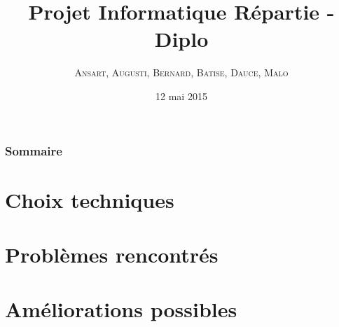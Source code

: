 \documentclass[handout]{beamer}
\title{
	Projet Informatique Répartie - Diplo
}
\author{
	\textsc{Ansart}, \textsc{Augusti}, \textsc{Bernard},
	\textsc{Batise}, \textsc{Dauce}, \textsc{Malo}
}
\date{12 mai 2015}
\begin{document}
	\begin{frame}[plain]
		\titlepage
	\end{frame}

	\begin{frame}[plain]
		\frametitle{Sommaire}
		\tableofcontents
	\end{frame}

	\section{Choix techniques}
		

	\section{Problèmes rencontrés}
		

	\section{Améliorations possibles}
		
\end{document}
